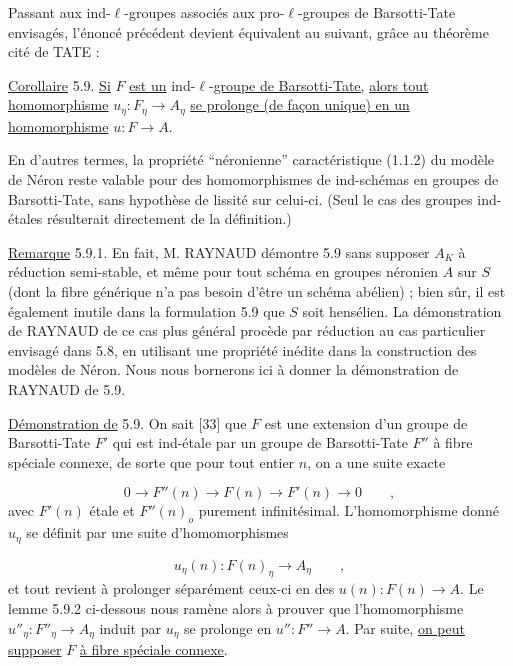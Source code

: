 Passant aux ind-$\ell$-groupes associés aux pro-$\ell$-groupes de Barsotti-Tate envisagés, l'énoncé précédent devient équivalent au suivant, grâce au théorème cité de TATE :

\underline{Corollaire} 5.9. \underline{Si} $F$ \underline{est un} ind-$\ell$-\underline{groupe de Barsotti-Tate,} \underline{alors tout} \underline{homomorphisme} $u_\eta : F_\eta \longrightarrow A_\eta$ \underline{se prolonge (de façon unique) en un homomorphisme} $u: F \longrightarrow A$.

En d'autres termes, la propriété ``néronienne'' caractéristique (1.1.2) du modèle de Néron reste valable pour des homomorphismes de ind-schémas en groupes de Barsotti-Tate, sans hypothèse de lissité sur celui-ci. (Seul le cas des groupes ind-étales résulterait directement de la définition.)



\underline{Remarque} 5.9.1.  En fait, M. RAYNAUD démontre 5.9 sans supposer $A_K$ à réduction semi-stable, et même pour tout schéma en groupes néronien $A$ sur $S$ (dont la fibre générique n'a pas besoin d'être un schéma abélien) ; bien sûr, il est également inutile dans la formulation 5.9 que $S$ soit hensélien. La démonstration de RAYNAUD de ce cas plus général procède par réduction au cas particulier envisagé dans 5.8, en utilisant une propriété inédite dans la construction des modèles de Néron. Nous nous bornerons ici à donner la démonstration de RAYNAUD de 5.9.

\underline{Démonstration de} 5.9. On sait [33] que $F$ est une extension d'un groupe de Barsotti-Tate $F'$ qui est ind-étale par un groupe de Barsotti-Tate $F''$ à fibre spéciale connexe, de sorte que pour tout entier $n$, on a une suite exacte

\begin{equation*}
0 \longrightarrow F''(n) \longrightarrow F(n) \longrightarrow F'(n) \longrightarrow 0 \qquad ,
\end{equation*}
avec $F'(n)$ étale et $F''(n)_o$ purement infinitésimal. L'homomorphisme donné $u_\eta$ se définit par une suite d'homomorphismes

\begin{equation*}
u_\eta(n) : F(n)_\eta \longrightarrow A_\eta \qquad ,
\end{equation*}
et tout revient à prolonger séparément ceux-ci en des $u(n) : F(n) \longrightarrow A$. Le lemme 5.9.2 ci-dessous nous ramène alors à prouver que l'homomorphisme $u''_\eta : F''_\eta \longrightarrow A_\eta$ induit par $u_\eta$ se prolonge en $u'' : F'' \longrightarrow A$. Par suite, \underline{on peut supposer} $F$ \underline{à fibre spéciale connexe}.

